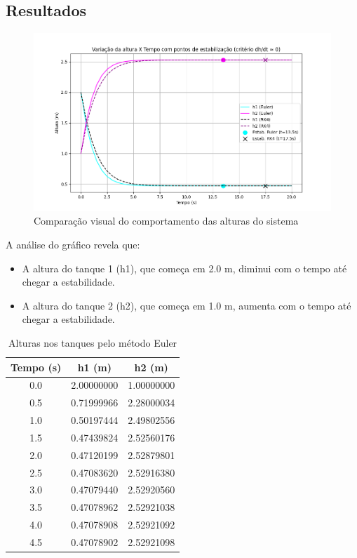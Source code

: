 \documentclass{article}
\begin{document}
\subsection*{Resultados}
\begin{figure}[H]
        \centering
        \includegraphics[width=1\textwidth, height=0.3\textheight, keepaspectratio]{Q1_alturas.png}
        \caption{Comparação visual do comportamento das alturas do sistema}\label{fig:alturas_tanques}
\end{figure}

A análise do gráfico revela que:
\begin{itemize}
    \item A altura do tanque 1 (h1), que começa em 2.0 m, diminui com o tempo até chegar a estabilidade.
    \item A altura do tanque 2 (h2), que começa em 1.0 m, aumenta com o tempo até chegar a estabilidade.
\end{itemize}

    \begin{table}[htbp]
    \centering
    \caption{Alturas nos tanques pelo método Euler}\label{tab:resultadosQ1}
    \begin{tabular}{c c c}
        \toprule
        \textbf{Tempo (s)} & \textbf{h1 (m)} & \textbf{h2 (m)} \\
        \midrule
        0.0 & 2.00000000 & 1.00000000 \\
        0.5 & 0.71999966 & 2.28000034 \\
        1.0 & 0.50197444 & 2.49802556 \\
        1.5 & 0.47439824 & 2.52560176 \\
        2.0 & 0.47120199 & 2.52879801 \\
        2.5 & 0.47083620 & 2.52916380 \\
        3.0 & 0.47079440 & 2.52920560 \\
        3.5 & 0.47078962 & 2.52921038 \\
        4.0 & 0.47078908 & 2.52921092 \\
        4.5 & 0.47078902 & 2.52921098 \\
        \bottomrule
    \end{tabular}
\end{table}
\end{document}
